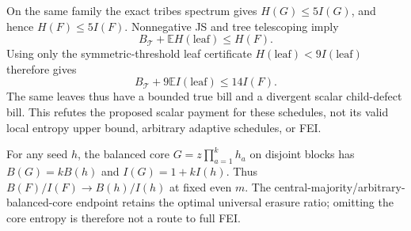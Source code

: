 \documentclass{article}
\begin{document}
On the same family the exact tribes spectrum gives $H(G)\le5I(G)$,
and hence $H(F)\le5I(F)$. Nonnegative JS and tree telescoping imply
\[
B_{\mathcal T}+\mathbb EH(\mathrm{leaf})\le H(F).
\]
Using only the symmetric-threshold leaf certificate
$H(\mathrm{leaf})<9I(\mathrm{leaf})$ therefore gives
\[
\boxed{B_{\mathcal T}+9\mathbb EI(\mathrm{leaf})\le14I(F).}
\]
The same leaves thus have a bounded true bill and a divergent
scalar child-defect bill. This refutes the proposed scalar payment
for these schedules, not its valid local entropy upper bound,
arbitrary adaptive schedules, or FEI.

For any seed $h$, the balanced core $G=z\prod_{a=1}^k h_a$ on
disjoint blocks has $B(G)=kB(h)$ and $I(G)=1+kI(h)$.
Thus $B(F)/I(F)\to B(h)/I(h)$ at fixed even $m$.
The central-majority/arbitrary-balanced-core endpoint retains the
optimal universal erasure ratio; omitting the core entropy is
therefore not a route to full FEI.
\end{document}
